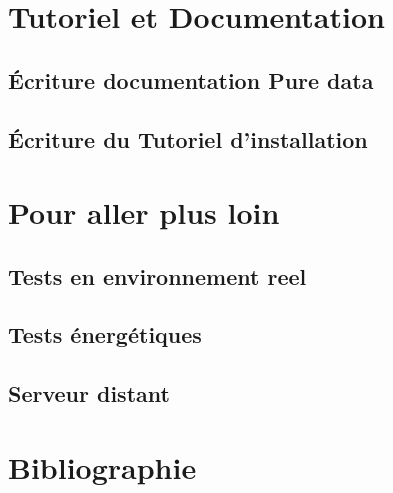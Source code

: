\documentclass[a4paper, titlepage, oneside, 12pt]{article}%
\begin{document}
\newpage
\section{Tutoriel et Documentation}
\subsection{Écriture documentation Pure data}
\subsection{Écriture du Tutoriel d'installation}

\newpage
\section{Pour aller plus loin}
\subsection{Tests en environnement reel}
\subsection{Tests énergétiques}
\subsection{Serveur distant}

\newpage
\section{Bibliographie}
\nocite{*}


\end{document}
